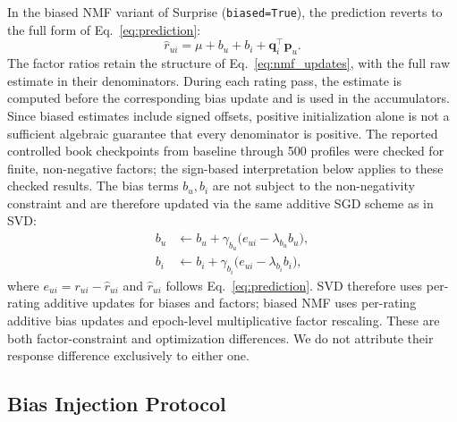 \documentclass[information,article,submit,pdftex,moreauthors]{Definitions/mdpi}
\newif\ifrevisionnotes
\newcommand{\saracomment}[1]{\ifrevisionnotes\par\smallskip\noindent\textcolor{orange}{\textbf{Sara:} #1}\par\smallskip\fi}
\begin{document}
In the biased NMF variant of Surprise (\texttt{biased=True}), the prediction reverts to the full form of Eq.~\eqref{eq:prediction}:
\begin{equation}
\hat{r}_{ui} = \mu + b_u + b_i + \mathbf{q}_i^\top \mathbf{p}_u.
\end{equation}
The factor ratios retain the structure of Eq.~\eqref{eq:nmf_updates}, with the full raw estimate in their denominators. During each rating pass, the estimate is computed before the corresponding bias update and is used in the accumulators. Since biased estimates include signed offsets, positive initialization alone is not a sufficient algebraic guarantee that every denominator is positive. The reported controlled book checkpoints from baseline through 500 profiles were checked for finite, non-negative factors; the sign-based interpretation below applies to these checked results.
The bias terms $b_u,b_i$ are not subject to the non-negativity constraint and are therefore updated via the same additive SGD scheme as in SVD:
\begin{equation}
\label{eq:nmf_bias_updates}
\begin{aligned}
b_u &\leftarrow b_u + \gamma_{b_u}\bigl(e_{ui} - \lambda_{b_u} b_u\bigr),\\
b_i &\leftarrow b_i + \gamma_{b_i}\bigl(e_{ui} - \lambda_{b_i} b_i\bigr),
\end{aligned}
\end{equation}
where $e_{ui}=r_{ui}-\hat{r}_{ui}$ and $\hat{r}_{ui}$ follows Eq.~\eqref{eq:prediction}. SVD therefore uses per-rating additive updates for biases and factors; biased NMF uses per-rating additive bias updates and epoch-level multiplicative factor rescaling. These are both factor-constraint and optimization differences. We do not attribute their response difference exclusively to either one.

\saracomment{Checked the update equations against Surprise documentation and source code. Clarified stored pre-update SVD factors, epoch-level NMF accumulators, signed bias terms and the conditions for multiplicative sign preservation. Non-negative factors are verified for the reported controlled book checkpoints rather than assumed for every possible biased-NMF run.}

\saracomment{Preserved the original injection exactly: every synthetic user rates every target item 5 and every other item 1. Replaced the unproved worst-case upper-bound claim with the controlled-probe rationale.}

\subsection{Bias Injection Protocol}
\label{sec:bias-injection}
\end{document}
